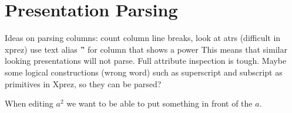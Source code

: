 \chapter{Presentation Parsing}
Ideas on parsing columns:
count column line breaks, look at atrs (difficult in xprez) use text alias '\^' for column that shows a power
This means that similar looking presentations will not parse. 
Full attribute inspection is tough. Maybe some logical constructions (wrong word) such as superscript and subscript as primitives in Xprez, so they can be parsed?

When editing $a^2$ we want to be able to put something in front of the $a$.
